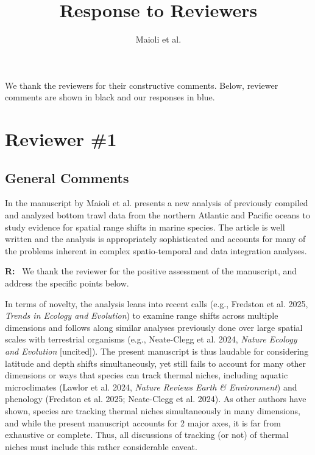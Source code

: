 \documentclass[11pt]{article}
\title{Response to Reviewers}
\author{Maioli et al.}
\date{}
\newcommand{\reviewer}[1]{\par\medskip\noindent\textcolor{revcolor}{#1}\par}
\newenvironment{reply}
{\par\smallskip\begingroup\color{replycolor}\noindent\textbf{R:}\ }
{\endgroup\par\medskip}
\begin{document}
\maketitle

\noindent We thank the reviewers for their constructive comments.
Below, reviewer comments are shown in \textcolor{revcolor}{black} and our responses in \textcolor{replycolor}{blue}.

\section*{Reviewer \#1}

\subsection*{General Comments}

\reviewer{In the manuscript by Maioli et al. presents a new analysis of previously compiled and analyzed bottom trawl data from the northern Atlantic and Pacific oceans to study evidence for spatial range shifts in marine species. The article is well written and the analysis is appropriately sophisticated and accounts for many of the problems inherent in complex spatio-temporal and data integration analyses.}

\begin{reply}
We thank the reviewer for the positive assessment of the manuscript, and address the specific points below.
\end{reply}

\reviewer{In terms of novelty, the analysis leans into recent calls (e.g., Fredston et al. 2025, \textit{Trends in Ecology and Evolution}) to examine range shifts across multiple dimensions and follows along similar analyses previously done over large spatial scales with terrestrial organisms (e.g., Neate-Clegg et al. 2024, \textit{Nature Ecology and Evolution} [uncited]). The present manuscript is thus laudable for considering latitude and depth shifts simultaneously, yet
still fails to account for many other dimensions or ways that species can track thermal niches, including aquatic microclimates (Lawlor et al. 2024, \textit{Nature Reviews Earth \& Environment}) and phenology (Fredston et al. 2025; Neate-Clegg et al. 2024). As other authors have shown, species are tracking thermal niches simultaneously in many dimensions, and while the present manuscript accounts for 2 major axes, it is far from exhaustive or complete. Thus, all discussions of tracking (or not) of thermal niches must include this rather considerable caveat.}
\end{document}
